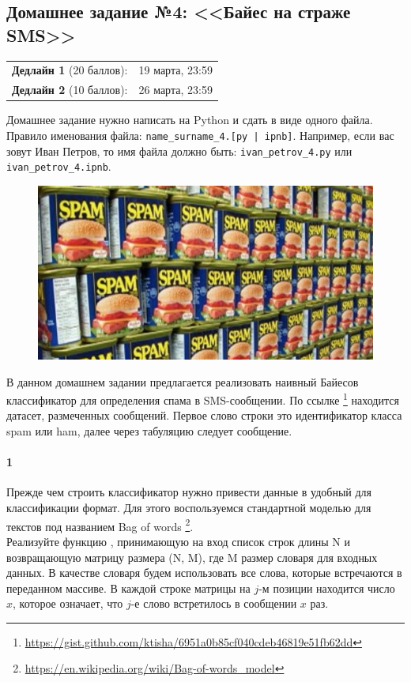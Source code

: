\documentclass[a4paper,12pt]{article}
\begin{document}
\subsection*{Домашнее задание №4: <<Байес на страже SMS>>}

\begin{tabular}{@{}lr}
  \textbf{Дедлайн 1} (20 баллов): & 19 марта, 23:59 \\
  \textbf{Дедлайн 2} (10 баллов): & 26 марта, 23:59
\end{tabular}

Домашнее задание нужно написать на Python и сдать в виде одного файла.
Правило именования файла: \texttt{name\_surname\_4.[py | ipnb]}. Например, если
вас зовут Иван Петров, то имя файла должно быть: \texttt{ivan\_petrov\_4.py} или \texttt{ivan\_petrov\_4.ipnb}.

\makebox[\linewidth]{\hrulefill}

\begin{figure}[h!]
  \centering
  \includegraphics[width=.8\linewidth]{images/spam}
\end{figure}

В данном домашнем задании предлагается реализовать наивный Байесов классификатор для определения спама в SMS-сообщении. По ссылке \footnote{\url{https://gist.github.com/ktisha/6951a0b85cf040cdeb46819e51fb62dd}} находится датасет, размеченных сообщений. Первое слово строки это идентификатор класса spam или ham, далее через табуляцию следует сообщение.

\paragraph{1} Прежде чем строить классификатор нужно привести данные в удобный для классификации формат. Для этого воспользуемся стандартной моделью для текстов под названием Bag of words \footnote{\url{https://en.wikipedia.org/wiki/Bag-of-words_model}}.\\ Реализуйте функцию , принимающую на вход список строк длины N и возвращающую матрицу размера (N, M), где M размер словаря для входных данных. В качестве словаря будем использовать все слова, которые встречаются в переданном массиве. 
В каждой строке матрицы на $j$-м позиции находится число $x$, которое означает, что $j$-е слово встретилось в сообщении $x$ раз.
\end{document}
